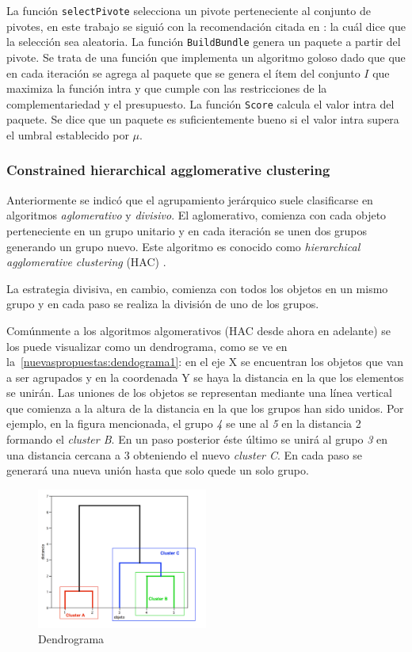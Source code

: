 La función \texttt{selectPivote} selecciona un pivote perteneciente al conjunto de pivotes, en este trabajo se siguió con la recomendación citada en \cite{Zhang:2002:ESI:638644.638646}: la cuál dice que la selección sea aleatoria. La función \texttt{BuildBundle} genera un paquete a partir del pivote. Se trata de una función que implementa un algoritmo goloso dado que que en cada iteración se agrega al paquete que se genera el ítem del conjunto $I$ que maximiza la función intra y que cumple con las restricciones de la complementariedad y el presupuesto. La función \texttt{Score} calcula el valor intra del paquete. Se dice que un paquete es suficientemente bueno si el valor intra supera el umbral establecido por $\mu$.

\subsubsection{Constrained hierarchical agglomerative clustering}
Anteriormente se indicó que el agrupamiento jerárquico suele clasificarse en algoritmos \textit{aglomerativo} y \textit{divisivo}. El aglomerativo, comienza con cada objeto perteneciente en un grupo unitario y en cada iteración se unen dos grupos generando un grupo nuevo. Este algoritmo es conocido como \textit{hierarchical agglomerative clustering} (HAC) \cite{journals/tkde/Amer-YahiaBCFMZ14}. 

La estrategia divisiva, en cambio, comienza con todos los objetos en un mismo grupo y en cada paso se realiza la división de uno de los grupos.

Comúnmente a los algoritmos algomerativos (HAC desde ahora en adelante) se los puede visualizar como un dendrograma, como se ve en la~\autoref{nuevaspropuestas:dendograma1}: en el eje X se encuentran los objetos que van a ser agrupados y en la coordenada Y se haya la distancia en la que los elementos se unirán. Las uniones de los objetos se representan mediante una línea vertical que comienza a la altura de la distancia en la que los grupos han sido unidos. Por ejemplo, en la figura mencionada, el grupo \textit{4} se une al \textit{5} en la distancia 2 formando el \textit{cluster B}. En un paso posterior éste último se unirá al grupo \textit{3} en una distancia cercana a 3 obteniendo el nuevo \textit{cluster C}. En cada paso se generará una nueva unión hasta que solo quede un solo grupo.

\begin{figure}[H]
  \centering
    \includegraphics[width=0.5\textwidth]{img/dendograma01.png}
  \caption{Dendrograma}
  \label{nuevaspropuestas:dendograma1}
\end{figure}

